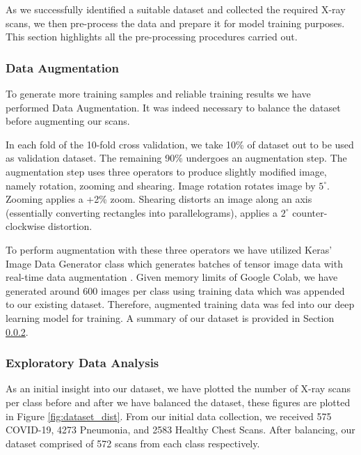 As we successfully identified a suitable dataset and collected the required X-ray scans, we then pre-process the data and prepare it for model training purposes. This section highlights all the pre-processing procedures carried out.

\subsubsection{Data Augmentation} \label{aug}

To generate more training samples and reliable training results we have performed Data Augmentation. It was indeed necessary to balance the dataset before augmenting our scans. 

In each fold of the 10-fold cross validation, we take 10\% of dataset out to be used as validation dataset. The remaining 90\% undergoes an augmentation step. The augmentation step uses three operators to produce slightly modified image, namely rotation, zooming and shearing. Image rotation rotates image by $5^{\circ}$. Zooming applies a +2\% zoom. Shearing distorts an image along an axis (essentially converting rectangles into parallelograms), applies a $2^{\circ}$ counter-clockwise distortion. 

To perform augmentation with these three operators we have utilized Keras' Image Data Generator class which generates batches of tensor image data with real-time data augmentation \cite{KER}. Given memory limits of Google Colab, we have generated around 600 images per class using training data which was appended to our existing dataset. Therefore, augmented training data was fed into our deep learning model for training. A summary of our dataset is provided in Section \ref{eda}.

\subsubsection{Exploratory Data Analysis} \label{eda}
As an initial insight into our dataset, we have plotted the number of X-ray scans per class before and after we have balanced the dataset, these figures are plotted in Figure \ref{fig:dataset_dist}. From our initial data collection, we received 575 COVID-19, 4273 Pneumonia, and 2583 Healthy Chest Scans. After balancing, our dataset comprised of 572 scans from each class respectively.


